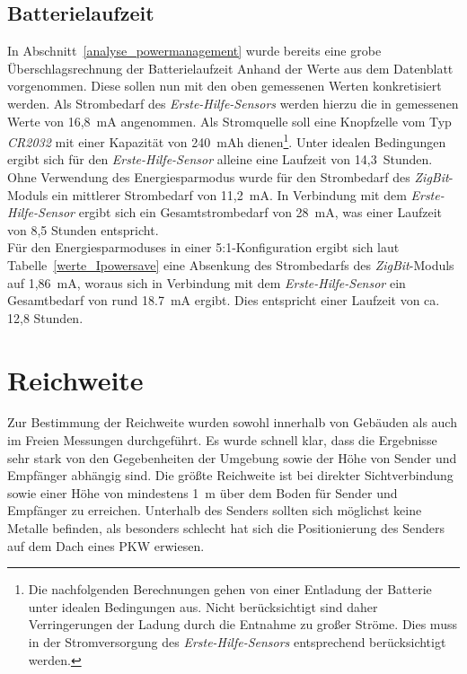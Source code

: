 \subsection{Batterielaufzeit}\label{batterielaufzeit}
In Abschnitt~\ref{analyse_powermanagement} wurde bereits eine grobe Überschlagsrechnung der Batterielaufzeit
Anhand der Werte aus dem Datenblatt vorgenommen. Diese sollen nun mit den oben gemessenen Werten konkretisiert
werden. Als Strombedarf des \emph{Erste-Hilfe-Sensors} werden hierzu die in \cite{Marco} gemessenen Werte von
16,8~mA angenommen. Als Stromquelle soll eine Knopfzelle vom Typ \emph{CR2032} mit einer Kapazität von 240~mAh 
dienen\footnote{Die nachfolgenden Berechnungen gehen von einer Entladung der Batterie unter idealen Bedingungen aus. 
Nicht berücksichtigt sind daher Verringerungen der Ladung durch die Entnahme zu großer Ströme. Dies muss in der
Stromversorgung des \emph{Erste-Hilfe-Sensors} entsprechend berücksichtigt werden.}. Unter 
idealen Bedingungen ergibt sich für den \emph{Erste-Hilfe-Sensor} alleine eine Laufzeit von 14,3~Stunden.\\
Ohne Verwendung des Energiesparmodus wurde für den Strombedarf des \emph{ZigBit}-Moduls ein mittlerer Strombedarf von 
11,2~mA. In Verbindung mit dem \emph{Erste-Hilfe-Sensor} ergibt sich ein Gesamtstrombedarf von 28~mA, was einer
Laufzeit von 8,5 Stunden entspricht.\\
Für den Energiesparmoduses in einer 5:1-Konfiguration ergibt sich laut Tabelle~\ref{werte_Ipowersave} eine Absenkung
des Strombedarfs des \emph{ZigBit}-Moduls auf 1,86~mA, woraus sich in Verbindung mit dem \emph{Erste-Hilfe-Sensor}
ein Gesamtbedarf von rund 18.7~mA ergibt. Dies entspricht einer Laufzeit von ca. 12,8 Stunden.\\

\section{Reichweite}
Zur Bestimmung der Reichweite wurden sowohl innerhalb von Gebäuden als auch im Freien Messungen durchgeführt. 
Es wurde schnell klar, dass die Ergebnisse sehr stark von den Gegebenheiten der Umgebung sowie der Höhe von
Sender und Empfänger abhängig sind. Die größte Reichweite ist bei direkter Sichtverbindung
sowie einer Höhe von mindestens 1~m über dem Boden für Sender und Empfänger zu erreichen. 
Unterhalb des Senders sollten sich möglichst keine Metalle befinden, als besonders schlecht hat sich die 
Positionierung des Senders auf dem Dach eines PKW erwiesen. 

